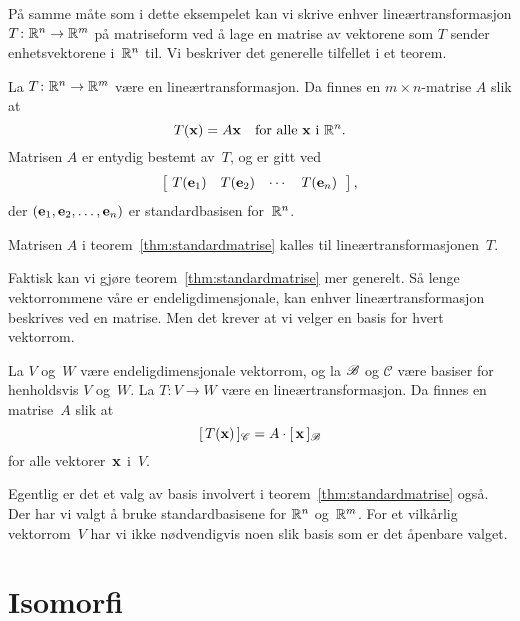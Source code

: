 På samme måte som i dette eksempelet kan vi skrive enhver
lineærtransformasjon $T \colon \mathbb{R}^n \to \mathbb{R}^m$ på matriseform ved å
lage en matrise av vektorene som $T$ sender enhetsvektorene i~$\mathbb{R}^n$
til.  Vi beskriver det generelle tilfellet i et teorem.

\begin{thm}
\label{thm:standardmatrise}
La $T \colon \mathbb{R}^n \to \mathbb{R}^m$ være en lineærtransformasjon.
Da finnes en $m \times n$-matrise $A$ slik at
\[
T(\mathbf{x}) = A\mathbf{x}
\quad\text{for alle $\mathbf{x}$ i $\mathbb{R}^n$.}
\]
Matrisen $A$ er entydig bestemt av~$T$, og er gitt ved
\[
\begin{bmatrix} \ T(\mathbf{e}_1) & T(\mathbf{e}_2) & \cdots & T(\mathbf{e}_n) \;\ \end{bmatrix},
\]
der $(\mathbf{e}_1, \mathbf{e}_2, \ldots, \mathbf{e}_n)$ er standardbasisen for~$\mathbb{R}^n$.
\end{thm}

\begin{defn}
Matrisen $A$ i teorem~\ref{thm:standardmatrise} kalles
 til lineærtransformasjonen~$T$.
\end{defn}


Faktisk kan vi gjøre teorem~\ref{thm:standardmatrise} mer generelt.
Så lenge vektorrommene våre er endeligdimensjonale, kan enhver
lineærtransformasjon beskrives ved en matrise.  Men det krever at vi
velger en basis for hvert vektorrom.

\begin{thm}
La $V$ og~$W$ være endeligdimensjonale vektorrom, og la $\mathscr{B}$ og
$\mathscr{C}$ være basiser for henholdsvis $V$ og~$W$.  La
$T \colon V \to W$ være en lineærtransformasjon.  Da finnes en
matrise~$A$ slik at
\[
[\,{T(\mathbf{x})}\,]_{\mathscr{C}} = A \cdot [\,{\mathbf{x}}\,]_{\mathscr{B}}
\]
for alle vektorer~$\mathbf{x}$ i~$V$.
\end{thm}

Egentlig er det et valg av basis involvert i
teorem~\ref{thm:standardmatrise} også.  Der har vi valgt å bruke
standardbasisene for $\mathbb{R}^n$ og~$\mathbb{R}^m$.  For et vilkårlig vektorrom~$V$
har vi ikke nødvendigvis noen slik basis som er det åpenbare valget.





\section*{Isomorfi}

